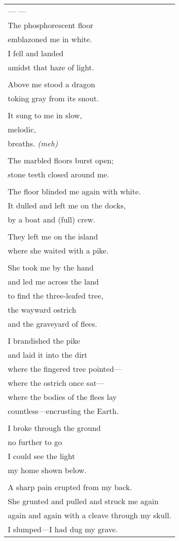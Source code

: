 \documentclass{article}
\begin{document}
\begin{tabular}{l}
\\
--- --- \\
The phosphorescent floor \\
emblazoned me in white. \\
I fell and landed \\
amidst that haze of light. \\
\\
Above me stood a dragon \\
toking gray from its snout. \\
\\
It sung to me in slow, \\
melodic, \\
breaths. \h\textit{(meh)}\\
\\
The marbled floors burst open; \\
stone teeth closed around me. \\
\\
The floor blinded me again with white. \\
It dulled and left me on the docks, \\
by a boat and (full) crew. \\
\\
They left me on the island \\
where she waited with a pike. \\
\\
She took me by the hand \\
and led me across the land \\
to find the three-leafed tree, \\
the wayward ostrich \\
and the graveyard of flees. \\
\\
I brandished the pike \\
and laid it into the dirt \\
where the fingered tree pointed--- \\
where the ostrich once sat--- \\
where the bodies of the flees lay \\
countless---encrusting the Earth. \\
\\
I broke through the ground \\
no further to go \\
I could see the light \\
my home shown below. \\
\\
A sharp pain erupted from my back. \\
She grunted and pulled and struck me again \\
again and again with a cleave through my skull. \\
I slumped---I had dug my grave. \\
\end{tabular} \\
\end{document}
